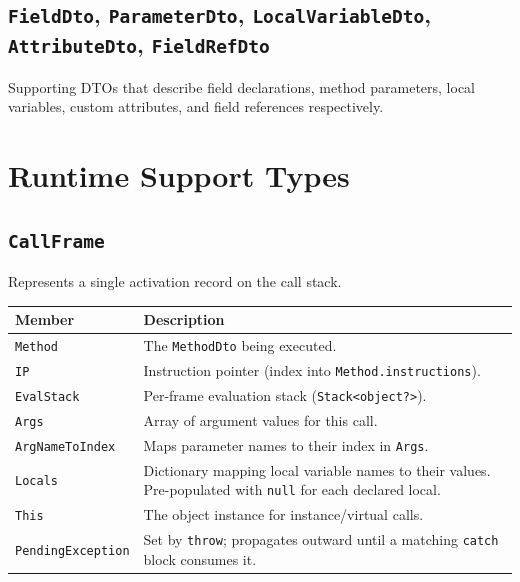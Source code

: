 \documentclass[11pt,a4paper]{article}
\newcommand{\code}[1]{\texttt{\small #1}}
\newcommand{\typename}[1]{\textcolor{typecolor}{\texttt{\small #1}}}
\begin{document}
\subsection{\texttt{FieldDto}, \texttt{ParameterDto}, \texttt{LocalVariableDto}, \texttt{AttributeDto}, \texttt{FieldRefDto}}

Supporting DTOs that describe field declarations, method parameters, local
variables, custom attributes, and field references respectively.

\section{Runtime Support Types}

\subsection{\texttt{CallFrame}}

Represents a single activation record on the call stack.

\begin{longtable}{lp{9cm}}
  \toprule
  \textbf{Member} & \textbf{Description} \\
  \midrule
  \endhead
  \code{Method}          & The \typename{MethodDto} being executed. \\
  \code{IP}              & Instruction pointer (index into \code{Method.instructions}). \\
  \code{EvalStack}       & Per-frame evaluation stack (\code{Stack<object?>}). \\
  \code{Args}            & Array of argument values for this call. \\
  \code{ArgNameToIndex}  & Maps parameter names to their index in \code{Args}. \\
  \code{Locals}          & Dictionary mapping local variable names to their values.
                           Pre-populated with \code{null} for each declared local. \\
  \code{This}            & The object instance for instance/virtual calls. \\
  \code{PendingException}& Set by \code{throw}; propagates outward until a matching
                           \code{catch} block consumes it. \\
  \bottomrule
\end{longtable}
\end{document}
